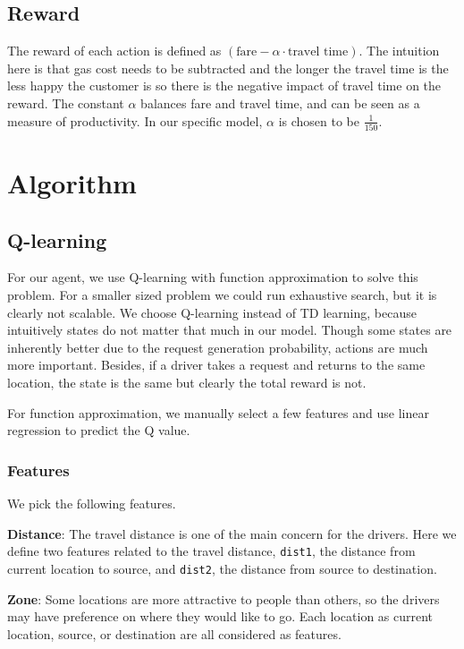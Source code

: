 \documentclass{article}
\begin{document}
\subsection{Reward}
The reward of each action is defined as $(\text{fare}-\alpha\cdot\text{travel time})$. The intuition here is that gas cost needs to be subtracted and the longer the travel time is the less happy the customer is so there is the negative impact of travel time on the reward. The constant $\alpha$ balances fare and travel time, and can be seen as a measure of productivity. In our specific model, $\alpha$ is chosen to be $\frac{1}{150}$.

\section{Algorithm}

\subsection{Q-learning}
For our agent, we use Q-learning with function approximation to solve this problem. For a smaller sized problem we could run exhaustive search, but it is clearly not scalable. We choose Q-learning instead of TD learning, because intuitively states do not matter that much in our model. Though some states are inherently better due to the request generation probability, actions are much more important. Besides, if a driver takes a request and returns to the same location, the state is the same but clearly the total reward is not.

For function approximation, we manually select a few features and use linear regression to predict the Q value.

\subsubsection{Features}
We pick the following features.

\textbf{Distance}:
The travel distance is one of the main concern for the drivers. Here we define two features related to the travel distance, \texttt{dist1}, the distance from current location to source, and \texttt{dist2}, the distance from source to destination.

\textbf{Zone}: Some locations are more attractive to people than others, so the drivers may have preference on where they would like to go. Each location as current location, source, or destination are all considered as features.
\end{document}
